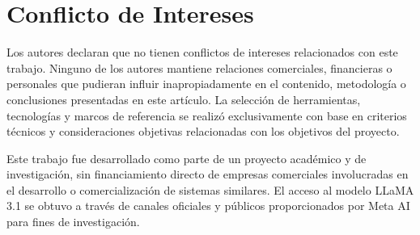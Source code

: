 \documentclass[12pt]{article}
\begin{document}
\section{Conflicto de Intereses}
Los autores declaran que no tienen conflictos de intereses relacionados con este trabajo. Ninguno de los autores mantiene relaciones comerciales, financieras o personales que pudieran influir inapropiadamente en el contenido, metodología o conclusiones presentadas en este artículo. La selección de herramientas, tecnologías y marcos de referencia se realizó exclusivamente con base en criterios técnicos y consideraciones objetivas relacionadas con los objetivos del proyecto.

Este trabajo fue desarrollado como parte de un proyecto académico y de investigación, sin financiamiento directo de empresas comerciales involucradas en el desarrollo o comercialización de sistemas similares. El acceso al modelo LLaMA 3.1 se obtuvo a través de canales oficiales y públicos proporcionados por Meta AI para fines de investigación.
\end{document}
